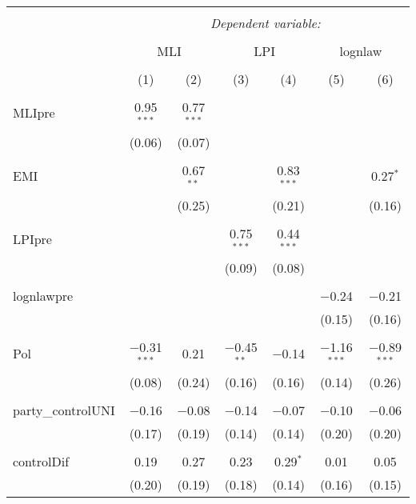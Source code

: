 
\begin{table}[!htbp] \centering 
  \caption{} 
  \label{} 
\begin{tabular}{@{\extracolsep{5pt}}lcccccc} 
\\[-1.8ex]\hline 
\hline \\[-1.8ex] 
 & \multicolumn{6}{c}{\textit{Dependent variable:}} \\ 
\cline{2-7} 
\\[-1.8ex] & \multicolumn{2}{c}{MLI} & \multicolumn{2}{c}{LPI} & \multicolumn{2}{c}{lognlaw} \\ 
\\[-1.8ex] & (1) & (2) & (3) & (4) & (5) & (6)\\ 
\hline \\[-1.8ex] 
 MLIpre & 0.95$^{***}$ & 0.77$^{***}$ &  &  &  &  \\ 
  & (0.06) & (0.07) &  &  &  &  \\ 
  & & & & & & \\ 
 EMI &  & 0.67$^{**}$ &  & 0.83$^{***}$ &  & 0.27$^{*}$ \\ 
  &  & (0.25) &  & (0.21) &  & (0.16) \\ 
  & & & & & & \\ 
 LPIpre &  &  & 0.75$^{***}$ & 0.44$^{***}$ &  &  \\ 
  &  &  & (0.09) & (0.08) &  &  \\ 
  & & & & & & \\ 
 lognlawpre &  &  &  &  & $-$0.24 & $-$0.21 \\ 
  &  &  &  &  & (0.15) & (0.16) \\ 
  & & & & & & \\ 
 Pol & $-$0.31$^{***}$ & 0.21 & $-$0.45$^{**}$ & $-$0.14 & $-$1.16$^{***}$ & $-$0.89$^{***}$ \\ 
  & (0.08) & (0.24) & (0.16) & (0.16) & (0.14) & (0.26) \\ 
  & & & & & & \\ 
 party\_controlUNI & $-$0.16 & $-$0.08 & $-$0.14 & $-$0.07 & $-$0.10 & $-$0.06 \\ 
  & (0.17) & (0.19) & (0.14) & (0.14) & (0.20) & (0.20) \\ 
  & & & & & & \\ 
 controlDif & 0.19 & 0.27 & 0.23 & 0.29$^{*}$ & 0.01 & 0.05 \\ 
  & (0.20) & (0.19) & (0.18) & (0.14) & (0.16) & (0.15) \\ 

\end{tabular}
\end{table}
